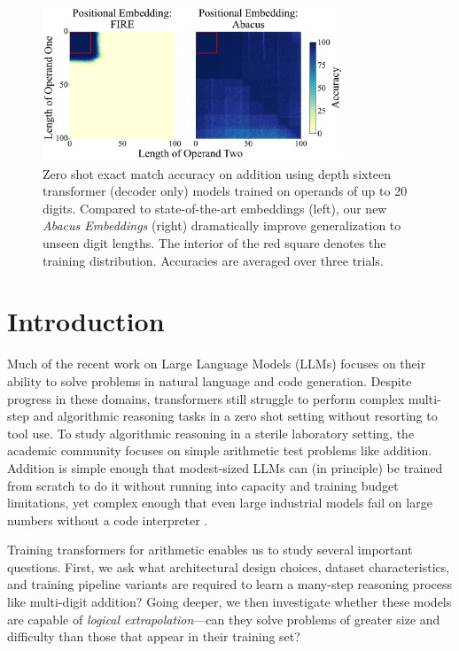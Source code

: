 \documentclass{article}
\begin{document}
\begin{figure}[ht!]
    \centering
    \includegraphics[width=0.8\textwidth]{Figures/grids_plot_one_cover.pdf}
    \caption{
    Zero shot exact match accuracy on addition using depth sixteen transformer (decoder only) models trained on operands of up to 20 digits. Compared to state-of-the-art embeddings (left), our new \textit{Abacus Embeddings} (right) dramatically improve generalization to unseen digit lengths. The interior of the red square denotes the training distribution. Accuracies are averaged over three trials.
    }
    \label{fig:cover_fig}
\end{figure}

\section{Introduction} 
\label{sec:intro}

Much of the recent work on  Large Language Models (LLMs) focuses on their ability to solve problems in natural language and code generation. 
Despite progress in these domains, transformers still struggle to perform complex multi-step and algorithmic reasoning tasks in a zero shot setting without resorting to tool use. 
To study algorithmic reasoning in a sterile laboratory setting, the academic community focuses on simple arithmetic test problems like addition.  
Addition is simple enough that modest-sized LLMs can (in principle) be trained from scratch to do it without running into capacity and training budget limitations, yet complex enough that even large industrial models fail on large numbers without a code interpreter \citep{loeber_16_2024}.

Training transformers for arithmetic enables us to study several important questions.  First, we ask what architectural design choices, dataset characteristics, and training pipeline variants are required to learn a many-step reasoning process like multi-digit addition? 
Going deeper, we then investigate whether these models are capable of {\em logical extrapolation}---can they solve problems of greater size and difficulty than those that appear in their training set? 
\end{document}
